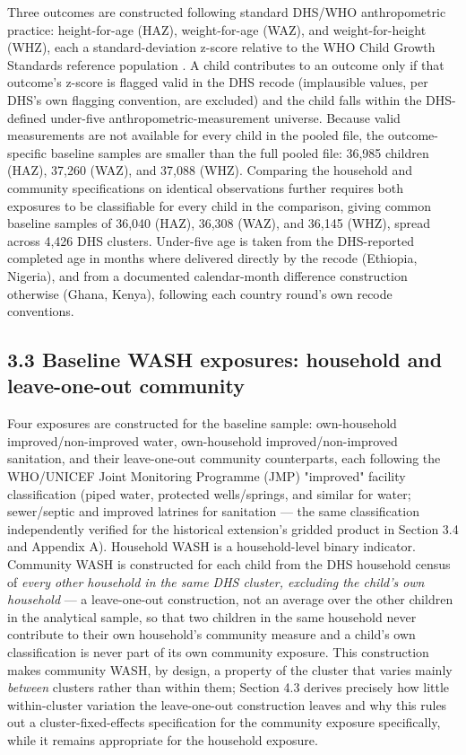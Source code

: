Three outcomes are constructed following standard DHS/WHO anthropometric practice: height-for-age (HAZ), weight-for-age (WAZ), and weight-for-height (WHZ), each a standard-deviation z-score relative to the WHO Child Growth Standards reference population \parencite{deOnis2006}. A child contributes to an outcome only if that outcome's z-score is flagged valid in the DHS recode (implausible values, per DHS's own flagging convention, are excluded) and the child falls within the DHS-defined under-five anthropometric-measurement universe. Because valid measurements are not available for every child in the pooled file, the outcome-specific baseline samples are smaller than the full pooled file: 36,985 children (HAZ), 37,260 (WAZ), and 37,088 (WHZ). Comparing the household and community specifications on identical observations further requires both exposures to be classifiable for every child in the comparison, giving common baseline samples of 36,040 (HAZ), 36,308 (WAZ), and 36,145 (WHZ), spread across 4,426 DHS clusters. Under-five age is taken from the DHS-reported completed age in months where delivered directly by the recode (Ethiopia, Nigeria), and from a documented calendar-month difference construction otherwise (Ghana, Kenya), following each country round's own recode conventions.

\subsection*{3.3 Baseline WASH exposures: household and leave-one-out community}

Four exposures are constructed for the baseline sample: own-household improved/non-improved water, own-household improved/non-improved sanitation, and their leave-one-out community counterparts, each following the WHO/UNICEF Joint Monitoring Programme (JMP) "improved" facility classification (piped water, protected wells/springs, and similar for water; sewer/septic and improved latrines for sanitation --- the same classification independently verified for the historical extension's gridded product in Section 3.4 and Appendix A). Household WASH is a household-level binary indicator. Community WASH is constructed for each child from the DHS household census of \textit{every other household in the same DHS cluster, excluding the child's own household} --- a leave-one-out construction, not an average over the other children in the analytical sample, so that two children in the same household never contribute to their own household's community measure and a child's own classification is never part of its own community exposure. This construction makes community WASH, by design, a property of the cluster that varies mainly \textit{between} clusters rather than within them; Section 4.3 derives precisely how little within-cluster variation the leave-one-out construction leaves and why this rules out a cluster-fixed-effects specification for the community exposure specifically, while it remains appropriate for the household exposure.


